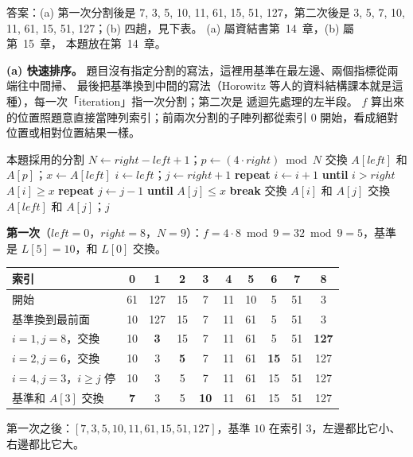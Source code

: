 \begin{pastsoln}
答案：(a) 第一次分割後是 7, 3, 5, 10, 11, 61, 15, 51, 127，第二次後是
3, 5, 7, 10, 11, 61, 15, 51, 127；(b) 四趟，見下表。 (a) 屬資結書第~14~章，(b) 屬第~15~章，
本題放在第~14~章。

\textbf{(a) 快速排序。} 題目沒有指定分割的寫法，這裡用基準在最左邊、兩個指標從兩端往中間掃、
最後把基準換到中間的寫法（Horowitz 等人的資料結構課本就是這種），每一次「iteration」指一次分割；第二次是
遞迴先處理的左半段。 $f$ 算出來的位置照題意直接當陣列索引；前兩次分割的子陣列都從索引 $0$
開始，看成絕對位置或相對位置結果一樣。

\begin{pseudo}{本題採用的分割}
    \State $N \gets \mathit{right} - \mathit{left} + 1$；$p \gets (4 \cdot \mathit{right}) \bmod N$
    \State 交換 $A[\mathit{left}]$ 和 $A[p]$；$x \gets A[\mathit{left}]$ 
    \State $i \gets \mathit{left}$；$j \gets \mathit{right} + 1$
    \While{\TRUE}
        \State \textbf{repeat} $i \gets i + 1$ \textbf{until} $i > \mathit{right}$ \OR $A[i] \ge x$
        \State \textbf{repeat} $j \gets j - 1$ \textbf{until} $A[j] \le x$
            \State \textbf{break}
        \EndIf
        \State 交換 $A[i]$ 和 $A[j]$
    \EndWhile
    \State 交換 $A[\mathit{left}]$ 和 $A[j]$；\Return $j$
\EndFunction
\end{pseudo}

\textbf{第一次}（$\mathit{left} = 0$，$\mathit{right} = 8$，$N = 9$）：$f = 4 \cdot 8 \bmod 9 =
32 \bmod 9 = 5$，基準是 $L[5] = 10$，和 $L[0]$ 交換。
\begin{center}
\small
\begin{tabular}{l*{9}{c}}
\toprule
索引 & 0 & 1 & 2 & 3 & 4 & 5 & 6 & 7 & 8 \\
\midrule
開始 & 61 & 127 & 15 & 7 & 11 & 10 & 5 & 51 & 3 \\
基準換到最前面 & 10 & 127 & 15 & 7 & 11 & 61 & 5 & 51 & 3 \\
$i = 1, j = 8$，交換 & 10 & \textbf{3} & 15 & 7 & 11 & 61 & 5 & 51 & \textbf{127} \\
$i = 2, j = 6$，交換 & 10 & 3 & \textbf{5} & 7 & 11 & 61 & \textbf{15} & 51 & 127 \\
$i = 4, j = 3$，$i \ge j$ 停 & 10 & 3 & 5 & 7 & 11 & 61 & 15 & 51 & 127 \\
基準和 $A[3]$ 交換 & \textbf{7} & 3 & 5 & \textbf{10} & 11 & 61 & 15 & 51 & 127 \\
\bottomrule
\end{tabular}
\end{center}
第一次之後：$[7, 3, 5, 10, 11, 61, 15, 51, 127]$，基準 $10$ 在索引 $3$，左邊都比它小、右邊都比它大。


\end{pastsoln}
